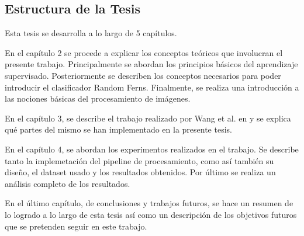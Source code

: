 \subsection{Estructura de la Tesis}

	Esta tesis se desarrolla a lo largo de 5 capítulos.	
		
	En el capítulo 2 se procede a explicar los conceptos teóricos que involucran el presente trabajo. Principalmente se abordan los principios básicos del aprendizaje supervisado. Posteriormente se describen los conceptos necesarios para poder introducir  el clasificador Random Ferns. Finalmente, se realiza una introducción a las nociones básicas del procesamiento de imágenes.
	
	 En el capítulo 3, se describe el trabajo realizado por Wang et al. en \cite{wang} y se explica qué partes del mismo se han implementado en la presente tesis.

	En el capítulo 4, se abordan los experimentos realizados en el trabajo. Se describe tanto la implemetación del pipeline de procesamiento, como así también su diseño, el dataset usado y los resultados obtenidos. Por último se realiza un análisis completo de los resultados.
	
	En el último capítulo, de conclusiones y trabajos futuros, se hace un resumen de lo logrado a lo largo de esta tesis así como un descripción de los objetivos futuros que se pretenden seguir en este trabajo.
